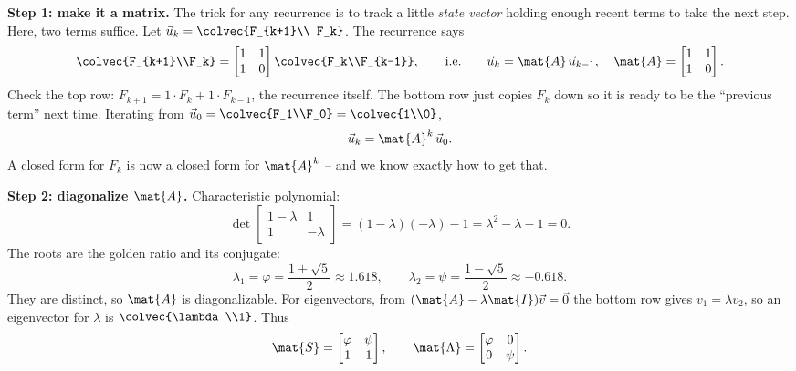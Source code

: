 \textbf{Step 1: make it a matrix.} The trick for any recurrence is to track a
little \emph{state vector} holding enough recent terms to take the next step.
Here, two terms suffice. Let $\vec{u}_k = \colvec{F_{k+1}\\ F_k}$. The recurrence
says
\[
  \colvec{F_{k+1}\\F_k} = \begin{bmatrix} 1 & 1 \\ 1 & 0 \end{bmatrix}\colvec{F_k\\F_{k-1}},
  \qquad\text{i.e.}\qquad
  \vec{u}_k = \mat{A}\,\vec{u}_{k-1},
  \quad
  \mat{A} = \begin{bmatrix} 1 & 1 \\ 1 & 0 \end{bmatrix}.
\]
Check the top row: $F_{k+1} = 1\cdot F_k + 1\cdot F_{k-1}$, the recurrence
itself. The bottom row just copies $F_k$ down so it is ready to be the ``previous
term'' next time. Iterating from $\vec{u}_0 = \colvec{F_1\\F_0} = \colvec{1\\0}$,
\[
  \vec{u}_k = \mat{A}^k\,\vec{u}_0.
\]
A closed form for $F_k$ is now a closed form for $\mat{A}^k$ -- and we know
exactly how to get that.

\textbf{Step 2: diagonalize $\mat{A}$.} Characteristic polynomial:
\[
  \det\begin{bmatrix} 1-\lambda & 1 \\ 1 & -\lambda \end{bmatrix}
  = (1-\lambda)(-\lambda) - 1
  = \lambda^2 - \lambda - 1 = 0.
\]
The roots are the golden ratio and its conjugate:
\[
  \lambda_1 = \varphi = \frac{1+\sqrt5}{2} \approx 1.618,
  \qquad
  \lambda_2 = \psi = \frac{1-\sqrt5}{2} \approx -0.618.
\]
They are distinct, so $\mat{A}$ is diagonalizable. For eigenvectors, from
$(\mat{A}-\lambda\mat{I})\vec{v}=\vec0$ the bottom row gives $v_1 = \lambda v_2$,
so an eigenvector for $\lambda$ is $\colvec{\lambda\\1}$. Thus
\[
  \mat{S} = \begin{bmatrix} \varphi & \psi \\ 1 & 1 \end{bmatrix},
  \qquad
  \mat{\Lambda} = \begin{bmatrix} \varphi & 0 \\ 0 & \psi \end{bmatrix}.
\]

